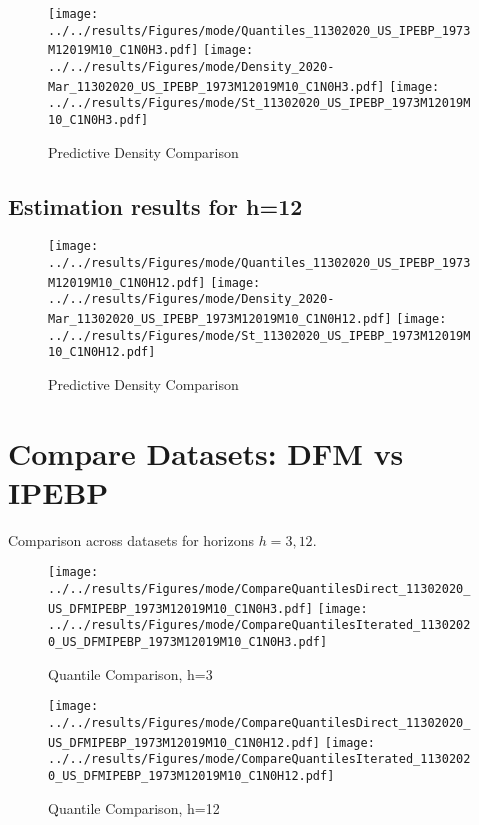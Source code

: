 \documentclass[12pt]{article}
\numberwithin{table}{subsection}
\numberwithin{figure}{section}
\begin{document}
\begin{figure}[htb!]
	\caption{Predictive Density Comparison}
	\centering
	\texttt{[image: ../../results/Figures/mode/Quantiles\_11302020\_US\_IPEBP\_1973M12019M10\_C1N0H3.pdf]}
	\texttt{[image: ../../results/Figures/mode/Density\_2020-Mar\_11302020\_US\_IPEBP\_1973M12019M10\_C1N0H3.pdf]}
	\texttt{[image: ../../results/Figures/mode/St\_11302020\_US\_IPEBP\_1973M12019M10\_C1N0H3.pdf]}
\end{figure}


\clearpage
\subsection{Estimation results for h=12}

\begin{figure}[htb!]
	\caption{Predictive Density Comparison}
	\centering
	\texttt{[image: ../../results/Figures/mode/Quantiles\_11302020\_US\_IPEBP\_1973M12019M10\_C1N0H12.pdf]}
	\texttt{[image: ../../results/Figures/mode/Density\_2020-Mar\_11302020\_US\_IPEBP\_1973M12019M10\_C1N0H12.pdf]}
	\texttt{[image: ../../results/Figures/mode/St\_11302020\_US\_IPEBP\_1973M12019M10\_C1N0H12.pdf]}
\end{figure}

\clearpage
\section{Compare Datasets: DFM vs IPEBP}
Comparison across datasets for horizons $h=3, 12$.
\begin{figure}[htb!]
	\caption{Quantile Comparison, h=3}
	\centering
	\texttt{[image: ../../results/Figures/mode/CompareQuantilesDirect\_11302020\_US\_DFMIPEBP\_1973M12019M10\_C1N0H3.pdf]}
	\texttt{[image: ../../results/Figures/mode/CompareQuantilesIterated\_11302020\_US\_DFMIPEBP\_1973M12019M10\_C1N0H3.pdf]}
\end{figure}

\begin{figure}[htb!]
	\caption{Quantile Comparison, h=12}
	\centering
	\texttt{[image: ../../results/Figures/mode/CompareQuantilesDirect\_11302020\_US\_DFMIPEBP\_1973M12019M10\_C1N0H12.pdf]}
	\texttt{[image: ../../results/Figures/mode/CompareQuantilesIterated\_11302020\_US\_DFMIPEBP\_1973M12019M10\_C1N0H12.pdf]}
\end{figure}
\end{document}
